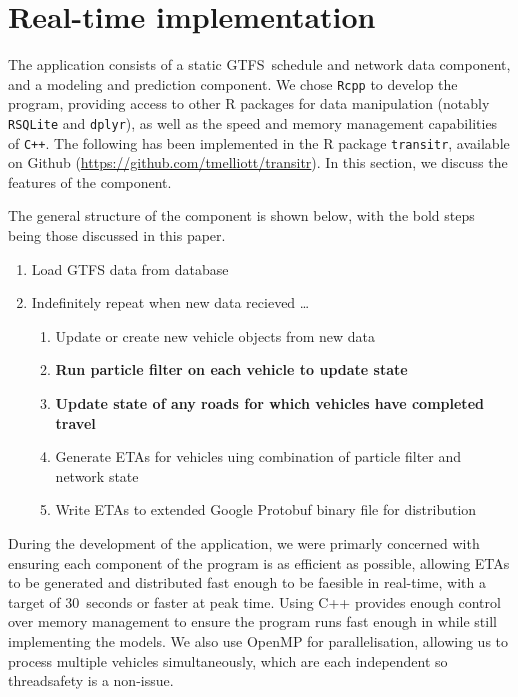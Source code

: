 \section{Real-time implementation}
\label{sec:rt}

The application consists of a
static GTFS~schedule and network data component,
and a \rt modeling and prediction component.
We chose \verb+Rcpp+ to develop the program,
providing access to other R packages for data manipulation 
(notably \verb+RSQLite+ and \verb+dplyr+),
as well as the speed and memory management capabilities of \verb|C++|. 
The following has been implemented in the R package
\verb+transitr+, available on Github (\url{https://github.com/tmelliott/transitr}).
In this section, we discuss the features of the \rt component.

The general structure of the \rt component is shown below,
with the bold steps being those discussed in this paper.
\begin{enumerate}
\item Load GTFS data from database
\item Indefinitely repeat when new data recieved \ldots
\begin{enumerate}
    \item Update or create new vehicle objects from new data
    \item \textbf{Run particle filter on each vehicle to update state}
    \item \textbf{Update state of any roads for which vehicles 
        have completed travel}
    \item Generate ETAs for vehicles uing combination of particle filter and network state
    \item Write ETAs to extended Google Protobuf binary file for distribution
\end{enumerate}
\end{enumerate}


During the development of the application,
we were primarly concerned with ensuring each component of the program
is as efficient as possible,
allowing ETAs to be generated and distributed fast enough to be faesible in real-time,
with a target of 30~seconds or faster at peak time.
Using C++ provides enough control over memory management
to ensure the program runs fast enough in \rt 
while still implementing the models.
We also use OpenMP for parallelisation,
allowing us to process multiple vehicles simultaneously,
which are each independent so threadsafety is a non-issue.


